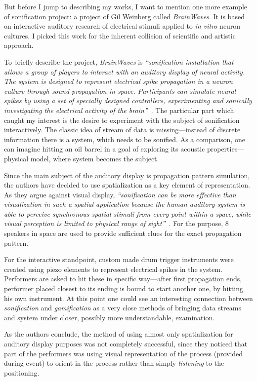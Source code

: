 \documentclass[12pt,a4paper,oneside]{report}
\begin{document}
But before I jump to describing my works, I want to mention one more example of sonification project: a project of Gil Weinberg called \emph{BrainWaves}. It is based on interactive auditory research of electrical stimuli applied to \emph{in vitro} neuron cultures. I picked this work for the inherent collision of scientific and artistic approach.

To briefly describe the project, \emph{BrainWaves} is \emph{``sonification installation that allows a group of players to interact with an auditory display of neural activity. The system is designed to represent electrical spike propagation in a neuron culture through sound propagation in space. Participants can simulate neural spikes by using a set of specially designed controllers, experimenting and sonically investigating the electrical activity of the brain''}~\cite[p.~9]{Weinberg2006}. The particular part which caught my interest is the desire to experiment with the subject of sonification interactively. The classic idea of stream of data is missing---instead of discrete information there is a system, which needs to be sonified. As a comparison, one can imagine hitting an oil barrel in a goal of exploring its acoustic properties---physical model, where system becomes the subject.

Since the main subject of the auditory display is propagation pattern simulation, the authors have decided to use spatialization as a key element of representation. As they argue against visual display, \emph{``sonification can be more effective than visualization in such a spatial application because the human auditory system is able to perceive synchronous spatial stimuli from every point within a space, while visual perception is limited to physical range of sight''}~\cite[p.~9]{Weinberg2006}. For the purpose, 8 speakers in space are used to provide sufficient clues for the exact propagation pattern.

For the interactive standpoint, custom made drum trigger instruments were created using piezo elements to represent electrical spikes in the system. Performers are asked to hit these in specific way---after first propagation ends, performer placed closest to its ending is bound to start another one, by hitting his own instrument. At this point one could see an interesting connection between \emph{sonification} and \emph{gamification} as a very close methods of bringing data streams and system under closer, possibly more understandable, examination.

As the authors conclude, the method of using almost only spatialization for auditory display purposes was not completely successful, since they noticed that part of the performers was using visual representation of the process (provided during event) to orient in the process rather than simply \emph{listening} to the positioning. 
\end{document}
